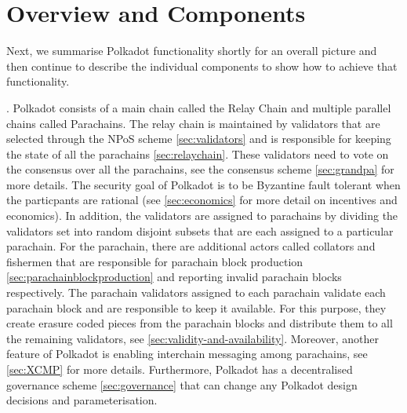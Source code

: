 \section{Overview and Components}\label{sec:components}
Next, we summarise Polkadot functionality shortly for an overall picture and then continue to describe the individual components to show how to achieve that functionality.

. Polkadot consists of a main chain called the Relay Chain and multiple parallel chains
called Parachains. The relay chain is maintained by validators that are selected through the NPoS scheme \ref{sec:validators} and is responsible for keeping the state of all the parachains \ref{sec:relaychain}.
These validators need to vote on the consensus over all the parachains, see the consensus scheme \ref{sec:grandpa} for more details.
The security goal of Polkadot is to be Byzantine fault tolerant when the particpants are rational (see \ref{sec:economics} for more detail on incentives and economics).
In addition, the validators are assigned to parachains by dividing the validators set into random disjoint subsets that are each assigned to a particular parachain.
For the parachain, there are additional actors called collators and fishermen that are responsible for parachain block production \ref{sec:parachainblockproduction} and reporting invalid parachain blocks respectively.
The parachain validators assigned to each parachain validate each parachain block and are responsible to keep it available. For this purpose, they create erasure coded pieces from the parachain blocks and distribute
them to all the remaining validators, see \ref{sec:validity-and-availability}. Moreover, another feature of Polkadot is enabling interchain messaging among parachains, see \ref{sec:XCMP} for more details.
Furthermore, Polkadot has a decentralised governance scheme \ref{sec:governance} that can change any Polkadot design decisions and parameterisation.








